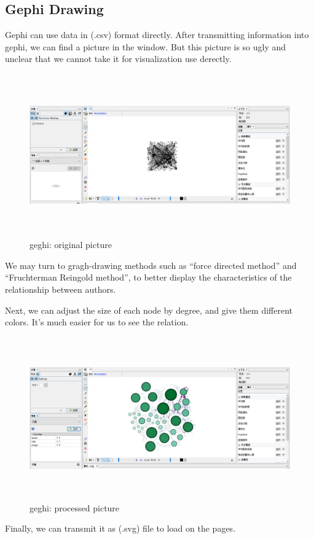 \documentclass{book}
\begin{document}
\subsection{Gephi Drawing}

Gephi can use data in (.csv) format directly. After transmitting information into gephi, we can find a picture in the window. But this picture is so ugly and unclear that we cannot take it for visualization use derectly.  

\begin{figure}[H]
\centering
\includegraphics[height=7.0cm,width=18.0cm]{img/yhb_ge_1.png}
\caption{geghi: original picture}
\end{figure}
We may turn to gragh-drawing methods such as ``force directed method'' and ``Fruchterman Reingold method'', to better display the characteristics of the relationship between authors.

Next, we can adjust the  size of each node by degree, and give them different colors.
It's much easier for us to see the relation.
\begin{figure}[H]
\centering
\includegraphics[height=7.0cm,width=18.0cm]{img/yhb_ge_2.png}
\caption{geghi: processed picture}
\end{figure}
Finally, we can transmit it as (.svg) file to load on the pages.
\end{document}
